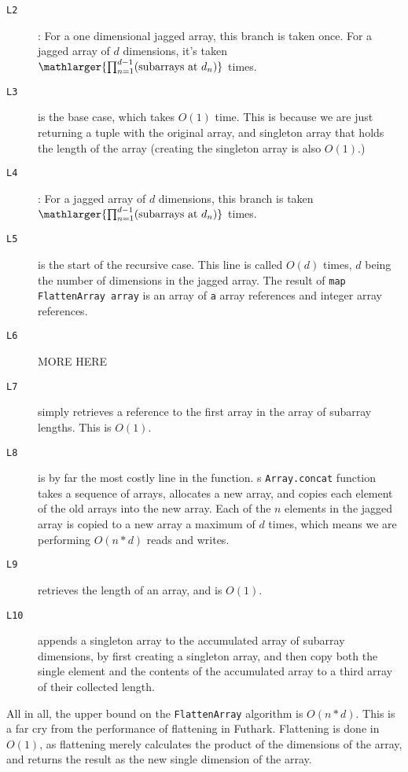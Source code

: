\begin{description}
\item[\texttt{L2}]: For a one dimensional jagged array, this branch is taken once.
  For a jagged array of $d$ dimensions, it's taken
  $\mathlarger{\prod_{n=1}^{d-1}(\text{subarrays at }d_n)}$ times.

\item[\texttt{L3}] is the base case, which takes $O(1)$ time. This is because we
are just returning a tuple with the original array, and singleton array that holds the length of the
array (creating the singleton array is also $O(1).$)

\item[\texttt{L4}]:
  For a jagged array of $d$ dimensions, this branch is taken
  $\mathlarger{\prod_{n=1}^{d-1}(\text{subarrays at }d_n)}$ times.

\item[\texttt{L5}] is the start of the recursive case. This line is called
  $O(d)$ times, $d$ being the number of dimensions in the jagged array.
  The result of \texttt{map FlattenArray array} is an array of \texttt{a} array references
  and integer array references.

\item[\texttt{L6}] MORE HERE
\item[\texttt{L7}] simply retrieves a reference to the first array in the array
  of subarray lengths. This is $O(1)$.
\item[\texttt{L8}] is by far the most costly line in the function.
  \fsharp{}s \texttt{Array.concat} function takes a sequence of arrays,
  allocates a new array, and copies each element of the old arrays into the new array.
  Each of the $n$ elements in the jagged array is copied to a new array a maximum of $d$
  times, which means we are performing $O(n*d)$ reads and writes.
  
\item[\texttt{L9}] retrieves the length of an array, and is $O(1)$.

\item[\texttt{L10}] appends a singleton array to the accumulated array of
  subarray dimensions, by first creating a singleton array, and then copy both
  the single element and the contents of the accumulated array to a third array
  of their collected length.
\end{description}

All in all, the upper bound on the \texttt{FlattenArray} algorithm is $O(n*d)$.
This is a far cry from the performance of flattening in Futhark. Flattening is
done in $O(1)$, as flattening merely calculates the product of the dimensions of
the array, and returns the result as the new single dimension of the array.


